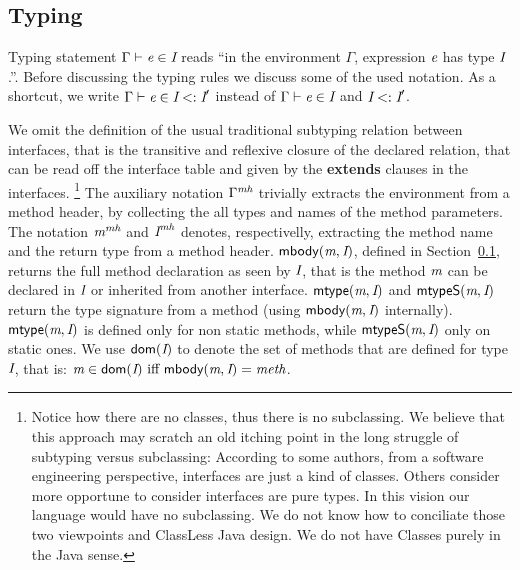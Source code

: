 \subsection{Typing}

Typing statement $\Gamma \vdash \textit{e}\in\textit{I}$ reads ``in the environment
$\Gamma$, expression $\textit{e}$ has type $\textit{I}$.''. 
Before discussing the typing rules we discuss some of the used notation.
As a shortcut, we write
$\Gamma \vdash \textit{e}\in\textit{I}<:\textit{I}'$ instead of $\Gamma \vdash \textit{e}\in\textit{I}$ and
$\textit{I}<:\textit{I}'$.  

We omit the definition of
the usual traditional subtyping relation between interfaces, that is the transitive and reflexive closure of the declared \Q@extends@ relation, that can be read off the interface table and given by the
\textbf{extends} clauses in the interfaces. %
\footnote{ Notice how there are no classes, thus there is no
  subclassing.  We believe that this approach may scratch an old
  itching point in the long struggle of subtyping versus subclassing:
  According to some authors, from a software engineering perspective,
  interfaces are just a kind of classes. Others consider more
  opportune to consider interfaces are pure types. In this vision our
  language would have no subclassing. We do not know how to conciliate
  those two viewpoints and ClassLess Java design. We do not have
  Classes purely in the Java sense.}
The auxiliary notation $\Gamma^\textit{mh}$ trivially
extracts the environment from a method header, by collecting the all types
and names of the method parameters.  The
notation $\textit{m}^\textit{mh}$ and $\textit{I}^\textit{mh}$ denotes, respectivelly, extracting the
method name and the return type from a method header. $\textsf{mbody}(\textit{m},\textit{I})$,
defined in Section~\ref{},
returns the full method declaration as seen by $\textit{I}$, that is the
method $\textit{m}$ can be declared in $\textit{I}$ or inherited from another
interface. 
$\textsf{mtype}(\textit{m},\textit{I})$ and $\textsf{mtypeS}(\textit{m},\textit{I})$ return the type
signature from a method (using $\textsf{mbody}(\textit{m},\textit{I})$ internally).
$\textsf{mtype}(\textit{m},\textit{I})$ is defined only for non static methods, while
$\textsf{mtypeS}(\textit{m},\textit{I})$ only on static ones. We use $\textsf{dom}(\textit{I})$ to
denote the set of methods that are defined for type $\textit{I}$, that is:
$\m\in\dom(\C)\ \miff \ \mBody(\m,\C)=\method$.

